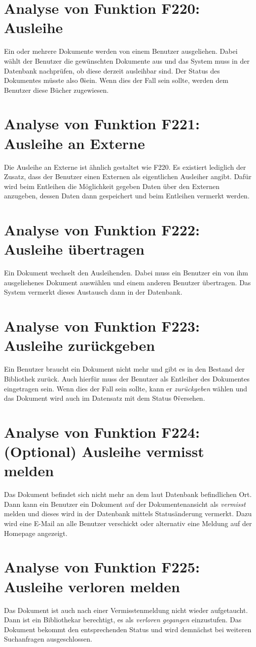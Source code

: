 \section{Analyse von Funktion F220: Ausleihe}
Ein oder mehrere Dokumente werden von einem Benutzer ausgeliehen. Dabei wählt der Benutzer die gewünschten Dokumente aus und das System muss in der Datenbank nachprüfen, ob diese derzeit ausleihbar sind. Der Status des Dokumentes müsste also \"0\" sein. Wenn dies der Fall sein sollte, werden dem Benutzer diese Bücher zugewiesen.

\section{Analyse von Funktion F221: Ausleihe an Externe}
Die Ausleihe an Externe ist ähnlich gestaltet wie F220. Es existiert lediglich der Zusatz, dass der Benutzer einen Externen als eigentlichen Ausleiher angibt. Dafür wird beim Entleihen die Möglichkeit gegeben Daten über den Externen anzugeben, dessen Daten dann gespeichert und beim Entleihen vermerkt werden.

\section{Analyse von Funktion F222: Ausleihe übertragen}
Ein Dokument wechselt den Ausleihenden. Dabei muss ein Benutzer ein von ihm ausgeliehenes Dokument auswählen und einem anderen Benutzer übertragen. Das System vermerkt dieses Austausch dann in der Datenbank. 

\section{Analyse von Funktion F223: Ausleihe zurückgeben}
Ein Benutzer braucht ein Dokument nicht mehr und gibt es in den Bestand der Bibliothek zurück. Auch hierfür muss der Benutzer als Entleiher des Dokumentes eingetragen sein. Wenn dies der Fall sein sollte, kann er \emph{zurückgeben} wählen und das Dokument wird auch im Datensatz mit dem Status \"0\" versehen.

\section{Analyse von Funktion F224: (Optional) Ausleihe vermisst melden}
Das Dokument befindet sich nicht mehr an dem laut Datenbank befindlichen Ort. Dann kann ein Benutzer ein Dokument auf der Dokumentenansicht als \emph{vermisst} melden und dieses wird in der Datenbank mittels Statusänderung vermerkt. Dazu wird eine E-Mail an alle Benutzer verschickt oder alternativ eine Meldung auf der Homepage angezeigt.

\section{Analyse von Funktion F225: Ausleihe verloren melden}
Das Dokument ist auch nach einer Vermisstenmeldung nicht wieder aufgetaucht. Dann ist ein Bibliothekar berechtigt, es als \emph{verloren gegangen} einzustufen. Das Dokument bekommt den entsprechenden Status und wird demnächst bei weiteren Suchanfragen ausgeschlossen.